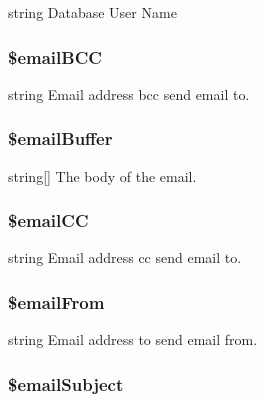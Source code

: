string Database User Name \hypertarget{class_debug_ace2c8fd77a23d56cfdc35a142df1b1ab}{
\subsubsection[{\$email\-B\-C\-C}]{\setlength{\rightskip}{0pt plus 5cm}\$email\-B\-C\-C\hspace{0.3cm}{\ttfamily [static]}}}\label{class_debug_ace2c8fd77a23d56cfdc35a142df1b1ab}
string Email address bcc send email to. \hypertarget{class_debug_a6da5505f5274a47a70fb0cbac5eef25e}{
\subsubsection[{\$email\-Buffer}]{\setlength{\rightskip}{0pt plus 5cm}\$email\-Buffer\hspace{0.3cm}{\ttfamily [static]}}}\label{class_debug_a6da5505f5274a47a70fb0cbac5eef25e}
string\mbox{[}\mbox{]} The body of the email. \hypertarget{class_debug_aef55490ba633a1821bc784c7c5e5a5e5}{
\subsubsection[{\$email\-C\-C}]{\setlength{\rightskip}{0pt plus 5cm}\$email\-C\-C\hspace{0.3cm}{\ttfamily [static]}}}\label{class_debug_aef55490ba633a1821bc784c7c5e5a5e5}
string Email address cc send email to. \hypertarget{class_debug_a8812e953c70aa15f8f01e0a83230e645}{
\subsubsection[{\$email\-From}]{\setlength{\rightskip}{0pt plus 5cm}\$email\-From\hspace{0.3cm}{\ttfamily [static]}}}\label{class_debug_a8812e953c70aa15f8f01e0a83230e645}
string Email address to send email from. \hypertarget{class_debug_afc4243e1cc62688011c169b622433f64}{
\subsubsection[{\$email\-Subject}]{\setlength{\rightskip}{0pt plus 5cm}\$email\-Subject\hspace{0.3cm}{\ttfamily [static]}}}\label{class_debug_afc4243e1cc62688011c169b622433f64}
